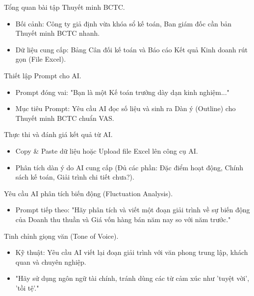 \documentclass[aspectratio=169]{beamer}
\begin{document}
\begin{frame}{Tổng quan bài tập Thuyết minh BCTC.}
    \begin{itemize}
        \item Bối cảnh: Công ty giả định vừa khóa sổ kế toán, Ban giám đốc cần bản Thuyết minh BCTC nhanh.
        \item Dữ liệu cung cấp: Bảng Cân đối kế toán và Báo cáo Kết quả Kinh doanh rút gọn (File Excel).
    \end{itemize}
\end{frame}


\begin{frame}{Thiết lập Prompt cho AI.}
    \begin{itemize}
        \item Prompt đóng vai: "Bạn là một Kế toán trưởng dày dạn kinh nghiệm..."
        \item Mục tiêu Prompt: Yêu cầu AI đọc số liệu và sinh ra Dàn ý (Outline) cho Thuyết minh BCTC chuẩn VAS.
    \end{itemize}
\end{frame}


\begin{frame}{Thực thi và đánh giá kết quả từ AI.}
    \begin{itemize}
        \item Copy \& Paste dữ liệu hoặc Upload file Excel lên công cụ AI.
        \item Phân tích dàn ý do AI cung cấp (Đủ các phần: Đặc điểm hoạt động, Chính sách kế toán, Giải trình chi tiết chưa?).
    \end{itemize}
\end{frame}


\begin{frame}{Yêu cầu AI phân tích biến động (Fluctuation Analysis).}
    \begin{itemize}
        \item Prompt tiếp theo: "Hãy phân tích và viết một đoạn giải trình về sự biến động của Doanh thu thuần và Giá vốn hàng bán năm nay so với năm trước."
    \end{itemize}
\end{frame}


\begin{frame}{Tinh chỉnh giọng văn (Tone of Voice).}
    \begin{itemize}
        \item Kỹ thuật: Yêu cầu AI viết lại đoạn giải trình với văn phong trung lập, khách quan và chuyên nghiệp.
        \item "Hãy sử dụng ngôn ngữ tài chính, tránh dùng các từ cảm xúc như 'tuyệt vời', 'tồi tệ'."
    \end{itemize}
\end{frame}
\end{document}
